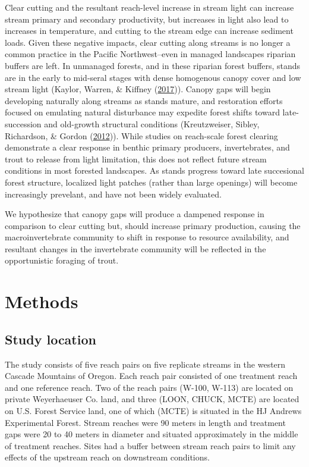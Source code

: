 \documentclass[double,12pt]{beavtex}
\begin{document}
  Clear cutting and the resultant reach-level increase in stream light can
  increase stream primary and secondary productivity, but increases in
  light also lead to increases in temperature, and cutting to the stream
  edge can increase sediment loads. Given these negative impacts, clear
  cutting along streams is no longer a common practice in the Pacific
  Northwest--even in managed landscapes riparian buffers are left. In
  unmanaged forests, and in these riparian forest buffers, stands are in
  the early to mid-seral stages with dense homogenous canopy cover and low
  stream light (Kaylor, Warren, \& Kiffney
  (\protect\hyperlink{ref-Kaylor2017FS}{2017})). Canopy gaps will begin
  developing naturally along streams as stands mature, and restoration
  efforts focused on emulating natural disturbance may expedite forest
  shifts toward late-succession and old-growth structural conditions
  (Kreutzweiser, Sibley, Richardson, \& Gordon
  (\protect\hyperlink{ref-Kreutzweiser2012}{2012})). While studies on
  reach-scale forest clearing demonstrate a clear response in benthic
  primary producers, invertebrates, and trout to release from light
  limitation, this does not reflect future stream conditions in most
  forested landscapes. As stands progress toward late succesional forest
  structure, localized light patches (rather than large openings) will
  become increasingly prevelant, and have not been widely evaluated.
  
  We hypothesize that canopy gaps will produce a dampened response in
  comparison to clear cutting but, should increase primary production,
  causing the macroinvertebrate community to shift in response to resource
  availability, and resultant changes in the invertebrate community will
  be reflected in the opportunistic foraging of trout.
  
  \chapter*{Methods}\label{methods}
  
  \section*{Study location}\label{study-location}
  
  The study consists of five reach pairs on five replicate streams in the
  western Cascade Mountains of Oregon. Each reach pair consisted of one
  treatment reach and one reference reach. Two of the reach pairs (W-100,
  W-113) are located on private Weyerhaeuser Co. land, and three (LOON,
  CHUCK, MCTE) are located on U.S. Forest Service land, one of which
  (MCTE) is situated in the HJ Andrews Experimental Forest. Stream reaches
  were 90 meters in length and treatment gaps were 20 to 40 meters in
  diameter and situated approximately in the middle of treatment reaches.
  Sites had a buffer between stream reach pairs to limit any effects of
  the upstream reach on downstream conditions.
  
\end{document}
